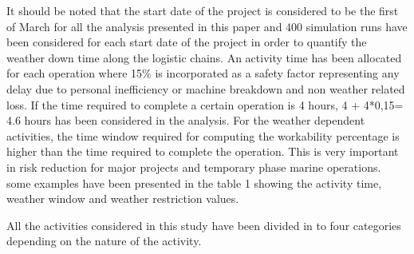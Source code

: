 It should be noted that the start date of the project is considered to be the first of March for all the analysis presented in this paper and 400 simulation runs have been considered for each start date of the project in order to quantify the weather down time along the logistic chains. An activity time has been allocated for each operation where 15\%  is incorporated as a safety factor representing any delay due to personal inefficiency or machine breakdown and non weather related loss. If the time required to complete a certain operation is 4 hours, 4 + 4*0,15= 4.6 hours has been considered in the analysis. For the weather dependent activities, the time window required for computing the workability percentage is higher than the time required to complete the operation. This is very important  in risk reduction for major projects and temporary phase marine operations. some examples have been presented in the table 1 showing the activity time, weather window and weather restriction values. 

All the activities considered in this study have been divided in to four categories depending on the nature of the activity. 



